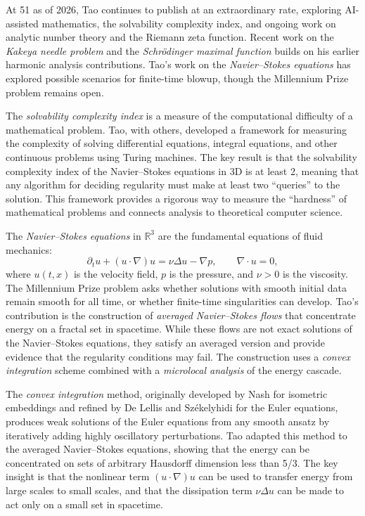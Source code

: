 At 51 as of 2026, Tao continues to publish at an extraordinary rate, exploring AI-assisted mathematics, the solvability complexity index, and ongoing work on analytic number theory and the Riemann zeta function. Recent work on the \emph{Kakeya needle problem} and the \emph{Schr\"{o}dinger maximal function} builds on his earlier harmonic analysis contributions. Tao's work on the \emph{Navier--Stokes equations} has explored possible scenarios for finite-time blowup, though the Millennium Prize problem remains open.

The \emph{solvability complexity index} is a measure of the computational difficulty of a mathematical problem. Tao, with others, developed a framework for measuring the complexity of solving differential equations, integral equations, and other continuous problems using Turing machines. The key result is that the solvability complexity index of the Navier--Stokes equations in 3D is at least 2, meaning that any algorithm for deciding regularity must make at least two ``queries'' to the solution. This framework provides a rigorous way to measure the ``hardness'' of mathematical problems and connects analysis to theoretical computer science.

The \emph{Navier--Stokes equations} in $\mathbb{R}^3$ are the fundamental equations of fluid mechanics:
\[
\partial_t u + (u \cdot \nabla) u = \nu \Delta u - \nabla p, \qquad \nabla \cdot u = 0,
\]
where $u(t,x)$ is the velocity field, $p$ is the pressure, and $\nu > 0$ is the viscosity. The Millennium Prize problem asks whether solutions with smooth initial data remain smooth for all time, or whether finite-time singularities can develop. Tao's contribution is the construction of \emph{averaged Navier--Stokes flows} that concentrate energy on a fractal set in spacetime. While these flows are not exact solutions of the Navier--Stokes equations, they satisfy an averaged version and provide evidence that the regularity conditions may fail. The construction uses a \emph{convex integration} scheme combined with a \emph{microlocal analysis} of the energy cascade.

The \emph{convex integration} method, originally developed by Nash for isometric embeddings and refined by De Lellis and Sz\'ekelyhidi for the Euler equations, produces weak solutions of the Euler equations from any smooth ansatz by iteratively adding highly oscillatory perturbations. Tao adapted this method to the averaged Navier--Stokes equations, showing that the energy can be concentrated on sets of arbitrary Hausdorff dimension less than 5/3. The key insight is that the nonlinear term $(u \cdot \nabla) u$ can be used to transfer energy from large scales to small scales, and that the dissipation term $\nu \Delta u$ can be made to act only on a small set in spacetime.

